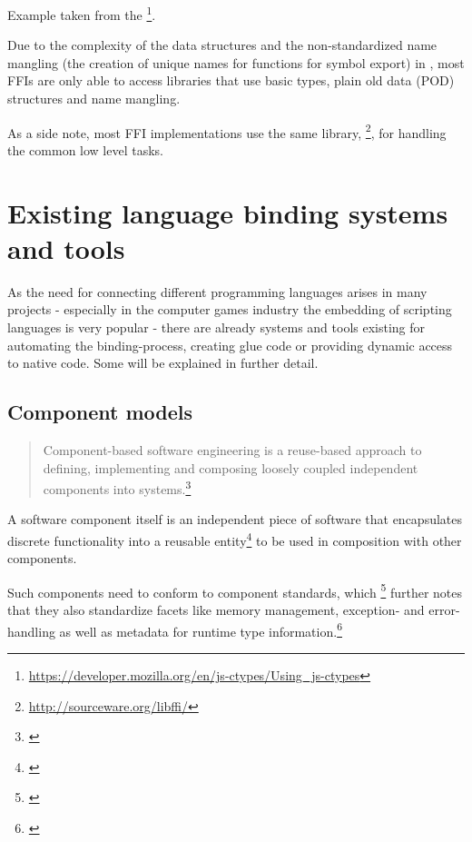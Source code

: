 Example taken from the \footnote{\url{https://developer.mozilla.org/en/js-ctypes/Using_js-ctypes}}.

Due to the complexity of the data structures and the non-standardized name mangling (the creation of unique names for functions for symbol export) in , most FFIs are only able to access libraries that use basic  types, plain old data (POD) structures and  name mangling.

As a side note, most FFI implementations use the same library, \footnote{\url{http://sourceware.org/libffi/}}, for handling the common low level tasks.


\section{Existing language binding systems and tools}

As the need for connecting different programming languages arises in many projects - especially in the computer games industry the embedding of scripting languages is very popular - there are already systems and tools existing for automating the binding-process, creating glue code or providing dynamic access to native code. Some will be explained in further detail.

\subsection{Component models}
\label{sec:ComponentModels}

\begin{quotation}
Component-based software engineering is a reuse-based approach to defining, implementing and composing loosely coupled independent components into systems.\footnote{\citep[460]{Sommerville}}
\end{quotation}

A software component itself is an independent piece of software that encapsulates discrete functionality into a reusable entity\footnote{\citep[3]{ComponentTechnology}} to be used in composition with other components.

Such components need to conform to component standards, which \footnote{\citep[440]{Sommerville}}  further notes that they also standardize facets like memory management, exception- and error-handling as well as metadata for runtime type information.\footnote{\citep[8]{ComponentTechnology}}

